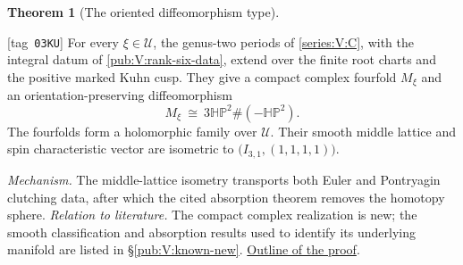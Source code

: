 \documentclass[11pt,a4paper]{article}
\numberwithin{equation}{section}
\theoremstyle{definition}
\newtheorem{maintheorem}{Theorem}
\newcommand{\StatementRecord}[4]{{\upshape\footnotesize[tag~\texttt{#3}]}\enspace\ignorespaces}
\begin{document}
\hypertarget{main-V-D}{}
\begin{maintheorem}[The oriented diffeomorphism type]
\hypertarget{tag-03KU}{}\label{series:V:D}
\StatementRecord{series:V:D}{proved}{03KU}{\cref{maps:src:F.3.7}, \cref{maps:src:F.4.1}}
For every $\xi\in\mathcal U$, the genus-two periods of
\cref{series:V:C}, with the integral datum of
\cref{pub:V:rank-six-data}, extend over the finite root charts
and the positive marked Kuhn cusp. They give a compact complex
fourfold $M_\xi$ and an orientation-preserving diffeomorphism
\[
 M_\xi\ \cong\ 3\mathbb{HP}^2\#(-\mathbb{HP}^2).
\]
The fourfolds form a holomorphic family over $\mathcal U$.
Their smooth middle lattice and spin characteristic vector are
isometric to $\bigl(I_{3,1},(1,1,1,1)\bigr)$.
\end{maintheorem}

\textit{Mechanism.} The middle-lattice isometry transports both Euler and Pontryagin clutching data, after which the cited absorption theorem removes the homotopy sphere.
\textit{Relation to literature.} The compact complex realization is new; the smooth classification and absorption results used to identify its underlying manifold are listed in \S\ref{pub:V:known-new}.
\hyperlink{outline-V-D}{Outline of the proof}.
\end{document}
